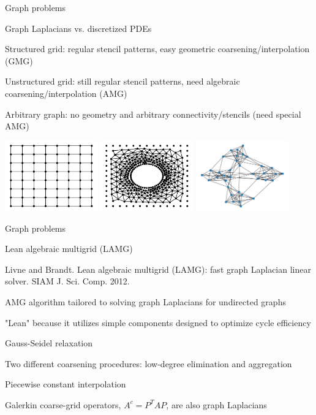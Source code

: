 \documentclass[18pt,xcolor=table]{beamer}
\begin{document}
\begin{frame}{Graph problems}
\begin{block}{Graph Laplacians vs. discretized PDEs}
\bit
\item Structured grid: regular stencil patterns, easy geometric coarsening/interpolation (GMG)
\item Unstructured grid: still regular stencil patterns, need algebraic coarsening/interpolation (AMG)
\item Arbitrary graph: no geometry and arbitrary connectivity/stencils (need special AMG)
\eit
\end{block}
\begin{center}
\includegraphics[width=0.3\textwidth]{../figures/structuredGrid}
\includegraphics[width=0.3\textwidth]{../figures/unstructuredGrid}
\includegraphics[width=0.3\textwidth]{../figures/graph}
\end{center}
\end{frame}

\begin{frame}{Graph problems}
\begin{block}{Lean algebraic multigrid (LAMG)}
\bit
\item Livne and Brandt. Lean algebraic multigrid (LAMG): fast graph Laplacian linear solver. SIAM J. Sci. Comp. 2012.
\item AMG algorithm tailored to solving graph Laplacians for undirected graphs
\item "Lean" because it utilizes simple components designed to optimize cycle efficiency
\bit
\item Gauss-Seidel relaxation
\item Two different coarsening procedures: low-degree elimination and aggregation
\item Piecewise constant interpolation
\item Galerkin coarse-grid operators, $A^c = P^TAP$, are also graph Laplacians 
\eit
\eit
\end{block}
\end{frame}
\end{document}
